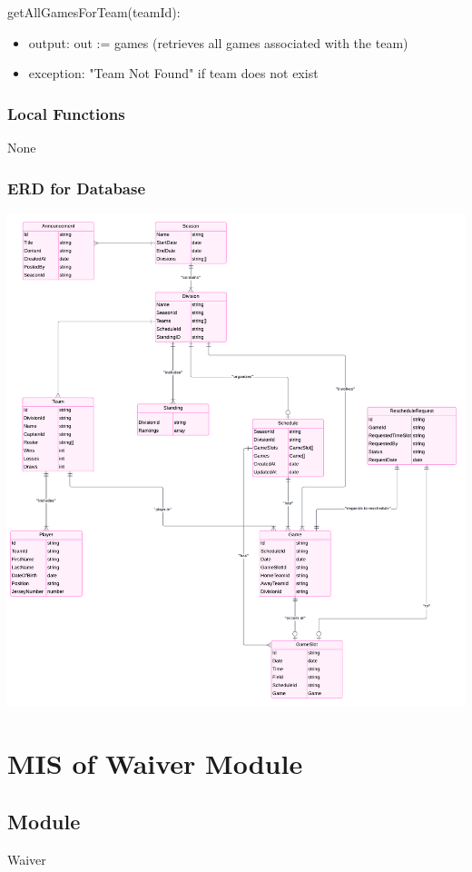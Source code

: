 \documentclass[12pt, titlepage]{article}
\begin{document}
\noindent getAllGamesForTeam(teamId):
\begin{itemize}
  \item output: out := games (retrieves all games associated with the team)
  \item exception: "Team Not Found" if team does not exist
\end{itemize}

\subsubsection{Local Functions}
None

\subsubsection{ERD for Database}
\includegraphics[scale=0.5]{Capstone_ERD.png}

\section{MIS of Waiver Module} \label{WaiverModule}

\subsection{Module}
Waiver
\end{document}
